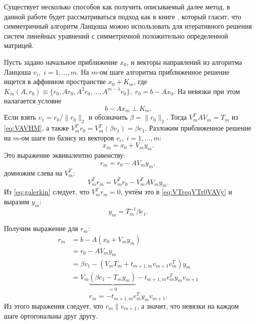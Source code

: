 Существует несколько способов как получить описываемый далее метод, в данной работе 
будет рассматриваться подход как в книге \cite{Saad2003}, который гласит, что симметричный 
алгоритм Ланцоша можно использовать для итеративного решения систем
линейных уравнений с симметричной положительно определенной матрицей. 
\par Пусть задано начальное приближение $x_0$, и векторы направлений из алгоритма
Ланцоша $v_i,\;i=1,...,m$.
На $m$-ом шаге алгоритма приближенное решение ищется в аффинном пространстве $x_0 + K_m$, 
где $K_m\left(A,r_0\right) \equiv \{r_0,Ar_0,A^2r_0,...,A^{m-1}r_0\}, \; r_0 = b - Ax_0$.
На невязки при этом налагается условие 
\begin{equation}
    \label{eq:galerkin}
    b-Ax_m \perp K_m.
\end{equation}
Если взять $v_1 = r_0/\|r_0\|_2$ и 
обозначить $\beta = \|r_0\|_2$. Тогда $V_m^TAV_m = T_m$ из \eqref{eq:VAVHM}, а также $V_m^Tr_0 = V_m^T(\beta v_1)=\beta e_1$.
Разложим приближенное решение на $m$-ом шаге по базису из векторов $v_i,\;i=1,...,m$:
\begin{equation}
    x_m = x_0 + V_m y_m.
\end{equation} 
Это выражение эквивалентно равенству:
 \begin{equation}
    r_m = r_0 - AV_m y_m, 
 \end{equation}
домножим слева на $V_m^T$:
\begin{equation}
    \label{eq:VTreqVTr0VAVy}
    V_m^T r_m = V_m^T r_0 - V_m^T AV_m y_m.
\end{equation}
Из \eqref{eq:galerkin} следует, что $ V_m^T r_m = 0 $, учтём это в \eqref{eq:VTreqVTr0VAVy} 
и выразим $y_m$:
\begin{equation}
    y_m = T_m^{-1} \beta e_1.
\end{equation}

\par Получим выражение для $r_m$:
\begin{align*}
    r_m &= b - A(x_0 + V_m y_m) \\
        &= r_0 - AV_m y_m \\
        &= \beta v_1 - (V_m T_m + t_{m+1,m}v_{m+1}e_m^T)y_m \\
        &= V_m \underbrace{(\beta e_1 - T_m y_m)}_{=0} - t_{m+1,m} e_m^T y_m v_{m+1}
\end{align*}
\begin{equation}
    \label{eq:r_m_SL}
    r_m = - t_{m+1,m} e_m^T y_m v_{m+1}.
\end{equation}
Из этого выражения следует, что $r_m \parallel v_{m+1}$, а значит, что невязки на каждом шаге ортогональны друг другу.

